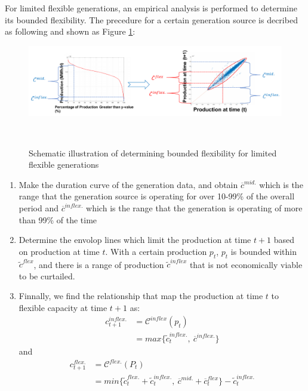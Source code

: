For limited flexible generations, an empirical analysis is performed to determine its bounded flexibility. The precedure for a certain generation source is decribed as following and shown as Figure \ref{fig:bounded-flexibility}:
	
 \begin{figure}[h!]
	\label{fig:bounded-flexibility}
	\includegraphics[scale=0.4]{Figures/BoundedFlexibility.pdf}
	\caption{Schematic illustration of determining bounded flexibility for limited flexible generations}\
\end{figure}


\begin{enumerate}
	\item Make the duration curve of the generation data, and obtain $\overline{c}^{mid.}$ which is the range that the generation source is operating for over 10-99\% of the overall period and $\overline{c}^{inflex.}$ which is the range that the generation is operating of more than 99\% of the time
	\item Determine the envolop lines which limit the production at time $t+1$ based on production at time $t$. With a certain production $p_{t}$, $p_{t}$ is bounded within $\tilde{c}^{flex}$, and there is a range of production $\tilde{c}^{inflex}$ that is not economically viable to be curtailed.
	\item Finnally, we find the relationship that map the production at time $t$ to flexible capacity at time $t+1$ as: 
	\begin{equation}
	\begin{aligned}
	c^{inflex.}_{t+1} &= \mathcal{C}^{inflex}(p_t)\\ &=max\{\tilde{c}^{inflex.}_t,~\overline{c}^{inflex.}\}
	\end{aligned}
	\end{equation}
	and
	\begin{equation}
	\begin{aligned}
	c^{flex.}_{t+1} &= \mathcal{C}^{flex.}(P_t) \\ & =min\{\tilde{c}^{flex.}_t+\tilde{c}^{inflex.}_t,~\overline{c}^{mid.}+\overline{c}^{flex}_t \} - \tilde{c}^{inflex.}_t
	\end{aligned}
	\end{equation}
\end{enumerate}

